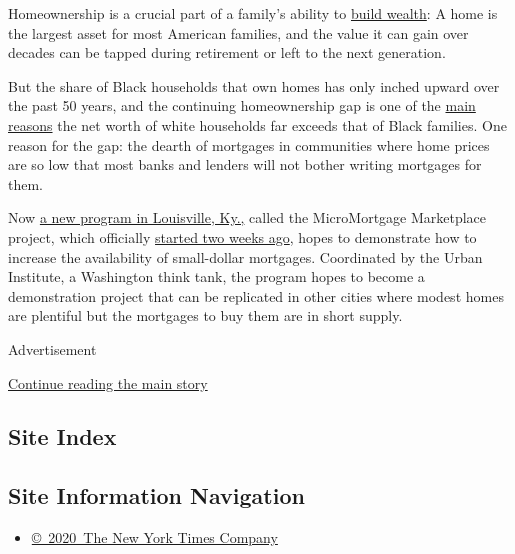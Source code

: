 Homeownership is a crucial part of a family's ability to
\href{https://www.nytimes.com/2020/06/09/your-money/race-income-equality.html}{build
wealth}: A home is the largest asset for most American families, and the
value it can gain over decades can be tapped during retirement or left
to the next generation.

But the share of Black households that own homes has only inched upward
over the past 50 years, and the continuing homeownership gap is one of
the
\href{https://www.brookings.edu/blog/up-front/2020/02/27/examining-the-black-white-wealth-gap/}{main
reasons} the net worth of white households far exceeds that of Black
families. One reason for the gap: the dearth of mortgages in communities
where home prices are so low that most banks and lenders will not bother
writing mortgages for them.

Now
\href{https://www.nytimes.com/2020/08/02/business/mortgages-affordable-housing.html}{a
new program in Louisville, Ky.,} called the MicroMortgage Marketplace
project, which officially
\href{https://www.newswire.com/news/micromortgage-marketplace-launches-in-support-of-small-dollar-home-21180593}{started
two weeks ago}, hopes to demonstrate how to increase the availability of
small-dollar mortgages. Coordinated by the Urban Institute, a Washington
think tank, the program hopes to become a demonstration project that can
be replicated in other cities where modest homes are plentiful but the
mortgages to buy them are in short supply.

Advertisement

\protect\hyperlink{after-bottom}{Continue reading the main story}

\hypertarget{site-index}{%
\subsection{Site Index}\label{site-index}}

\hypertarget{site-information-navigation}{%
\subsection{Site Information
Navigation}\label{site-information-navigation}}

\begin{itemize}
\tightlist
\item
  \href{https://help.nytimes.com/hc/en-us/articles/115014792127-Copyright-notice}{©~2020~The
  New York Times Company}
\end{itemize}

